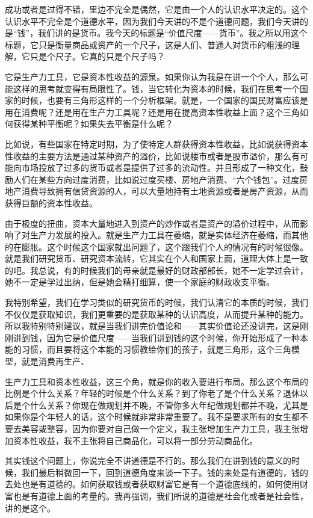 \documentclass[UTF8, 12pt, a4paper]{ctexrep}
\begin{document}
成功或者是过得不错，里边不完全是偶然，它是由一个人的认识水平决定的。这个认识水平不完全是个道德水平，因为我们今天讲的不是个道德问题，我们今天讲的是“钱”，我们讲的是货币。我今天的标题是“价值尺度——货币”。我之所以用这个标题，它只是衡量商品或资产的一个尺子，这是人们、普通人对货币的粗浅的理解，它只是个尺子。它真的只是个尺子吗？

它是生产力工具，它是资本性收益的源泉。如果你认为我是在讲一个个人，那么可能这样的思考就变得有局限性了。钱，当它转化为资本的时候，我们在思考一个国家的时候，也要有三角形这样的一个分析框架。就是，一个国家的国民财富应该是用在消费呢？还是用在生产力工具呢？还是用在提高资本性收益上面？这个三角如何获得某种平衡呢？如果失去平衡是什么呢？

比如说，有些国家在特定时期，为了使特定人群获得资本性收益，比如说获得资本性收益的主要方法是通过某种资产的溢价，比如说楼市或者是股市溢价，那么有可能向市场投放了过多的货币或者是提供了过多的流动性。并且形成了一种文化，鼓励人们在某些方向过度消费，比如说过度买楼、房地产消费、“六个钱包”。过度房地产消费导致拥有信贷资源的人，可以大量地持有土地资源或者是房产资源，从而获得巨额的资本性收益。

由于极度的扭曲，资本大量地进入到资产的炒作或者是资产的溢价过程中，从而影响了对生产力发展的投入。就是生产力工具在萎缩，就是实体经济在萎缩，而其他的在膨胀。这个时候这个国家就出问题了，这个跟我们个人的情况有的时候很像。就是我们研究货币、研究资本流转，它其实在个人和国家上面，道理大体上是一致的吧。我总说，有的时候我们的母亲就是最好的财政部部长，她不一定学过会计，她不一定是学过出纳，但是她会精打细算，使一个家庭的财政收支平衡。

我特别希望，我们在学习类似的研究货币的时候，我们认清它的本质的时候，我们不仅仅是获取知识，我们更重要的是获取某种的认识高度，从而提升某种的能力。所以我特别特别建议，就是当我们讲完价值论和——其实价值论还没讲完，这是刚刚讲到钱，因为它是价值尺度——当我们讲到钱的这个时候，你开始形成了一种本能的习惯，而且要将这个本能的习惯教给你们的孩子，就是三角形，这个三角模型，就是消费再生产、

生产力工具和资本性收益，这三个角，就是你的收入要进行布局。那么这个布局的比例是个什么关系？年轻的时候是个什么关系？到了你老了是个什么关系？退休以后是个什么关系？你现在做规划并不晚，不管你多大年纪做规划都并不晚，尤其是如果你是个年轻人的话，这个时候就非常非常重要了。我不是要求所有的女生都不要去美容或整容，因为你要对自己做一个定义，我主张增加生产力工具，我主张增加资本性收益，我不主张将自己商品化，可以将一部分劳动商品化。

其实钱这个问题上，你说完全不讲道德是不行的。那么我们在讲到钱的意义的时候，我们最后稍微回一下，回到道德角度来谈一下子。钱的来处是有道德的，钱的去处也是有道德的。如何获取钱或者获取财富它是有一个道德底线的，如何使用财富也是有道德上面的考量的。我再强调，我们所说的道德是社会化或者是社会性，讲的是这个。
\end{document}

